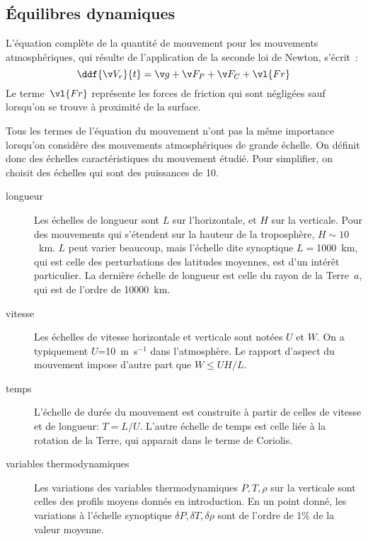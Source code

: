 
\sk
\subsection{Équilibres dynamiques}

\sk
L'équation complète de la quantité de mouvement pour les mouvements atmosphériques, qui résulte de l'application de la seconde loi de Newton, s'écrit~:
\[   
\ddf{\v V_r}{t} = \v g + \v F_P + \v F_C + \vl{Fr}
\] %
Le terme~$\vl{Fr}$ représente les forces de friction qui sont négligées sauf lorsqu'on se trouve à proximité de la surface.

\sk
Tous les termes de l'équation du mouvement n'ont pas la même importance lorsqu'on considère des mouvements atmosphériques de grande échelle. On définit donc des échelles caractéristiques du mouvement étudié. Pour simplifier, on choisit des échelles qui sont des puissances de 10.
\begin{description}
\item[longueur] Les échelles de longueur sont $L$ sur l'horizontale, et $H$ sur la verticale. Pour des mouvements qui s'étendent sur la hauteur de la troposphère, $H\sim 10$~km. $L$ peut varier beaucoup, mais l'échelle dite synoptique $L=$1000~km, qui est celle des perturbations des latitudes moyennes, est d'un intérêt particulier. La dernière échelle de longueur est celle du rayon de la Terre~$a$, qui est de l'ordre de 10000~km. 
\item[vitesse] Les échelles de vitesse horizontale et verticale sont notées $U$ et $W$. On a typiquement $U$=10~m~s$^{-1}$ dans l'atmosphère. Le rapport d'aspect du mouvement impose d'autre part que $W\le UH/L$.
\item[temps] L'échelle de durée du mouvement est construite à partir de celles de vitesse et de longueur: $T=L/U$. L'autre échelle de temps est celle liée à la rotation de la Terre, qui apparait dans le terme de Coriolis.
\item[variables thermodynamiques] Les variations des variables thermodynamiques $P,T,\rho$ sur la verticale sont celles des profils moyens donnés en introduction. En un point donné, les variations à l'échelle synoptique $\delta P,\delta T,\delta\rho$ sont de l'ordre de 1\% de la valeur moyenne.
\end{description}

